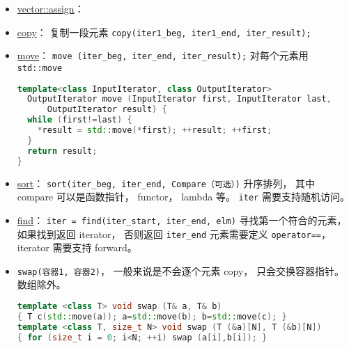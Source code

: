 
\begin{issues}
\issueDraft
\end{issues}

\begin{itemize}
\item \href{https://en.cppreference.com/w/cpp/container/vector/assign}{vector::assign}： 
\item \href{https://cplusplus.com/reference/algorithm/copy/}{copy}： 复制一段元素 \verb|copy(iter1_beg, iter1_end, iter_result);|
\item \href{https://cplusplus.com/reference/algorithm/move/}{move}： \verb|move (iter_beg, iter_end, iter_result);| 对每个元素用 \verb|std::move|
\begin{lstlisting}[language=cpp]
template<class InputIterator, class OutputIterator>
  OutputIterator move (InputIterator first, InputIterator last,
      OutputIterator result) {
  while (first!=last) {
    *result = std::move(*first); ++result; ++first;
  }
  return result;
}
\end{lstlisting}
\item \href{https://cplusplus.com/reference/algorithm/sort/}{sort}： \verb|sort(iter_beg, iter_end, Compare（可选）)| 升序排列， 其中 compare 可以是函数指针， functor， lambda 等。 \verb|iter| 需要支持随机访问。
\item \href{https://cplusplus.com/reference/algorithm/find/}{find}： \verb|iter = find(iter_start, iter_end, elm)| 寻找第一个符合的元素， 如果找到返回 iterator， 否则返回 \verb|iter_end| 元素需要定义 \verb|operator==|， iterator 需要支持 forward。
\item \verb|swap(容器1, 容器2)|， 一般来说是不会逐个元素 copy， 只会交换容器指针。 数组除外。
\begin{lstlisting}[language=cpp]
template <class T> void swap (T& a, T& b)
{ T c(std::move(a)); a=std::move(b); b=std::move(c); }
template <class T, size_t N> void swap (T (&a)[N], T (&b)[N])
{ for (size_t i = 0; i<N; ++i) swap (a[i],b[i]); }
\end{lstlisting}
\end{itemize}
